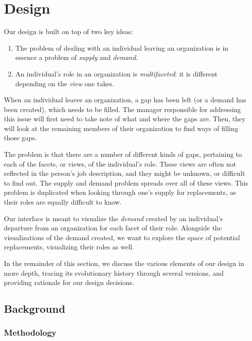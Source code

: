 \documentclass[journal]{vgtc}                %
\begin{document}
\section{Design}
\label{sec:design}

Our design is built on top of two key ideas:

\begin{enumerate}
\item The problem of dealing with an individual leaving an organization is in essence a problem of \emph{supply} and \emph{demand}. 
\item An individual's role in an organization is \emph{multifaceted}: it is different depending on the \emph{view} one takes.
\end{enumerate}

When an individual leaves an organization, a gap has been left (or a demand has been created), which needs to be filled. The manager responsible for addressing this issue will first need to take note of what and where the gaps are. Then, they will look at the remaining members of their organization to find ways of filling those gaps.

The problem is that there are a number of different kinds of gaps, pertaining to each of the facets, or views, of the individual's role. These views are often not reflected in the person's job description, and they might be unknown, or difficult to find out. The supply and demand problem spreads over all of these views. This problem is duplicated when looking through one's supply for replacements, as their roles are equally difficult to know.

Our interface is meant to visualize the \emph{demand} created by an individual's departure from an organization for each facet of their role. Alongside the visualizations of the demand created, we want to explore the space of potential replacements, visualizing their roles as well.

In the remainder of this section, we discuss the various elements of our design in more depth, tracing its evolutionary history through several versions, and providing rationale for our design decisions.

\subsection{Background}


\subsubsection{Methodology}
\label{sec:methodology}
\end{document}
